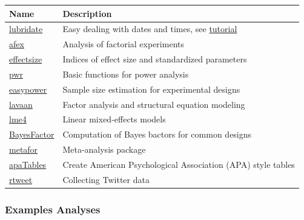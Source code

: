\documentclass[
]{scrartcl}
\newcounter{none} %
\begin{document}
{\def\LTcaptype{none} %
\begin{longtable}[]{@{}
  >{\raggedright\arraybackslash}p{}
  >{\raggedright\arraybackslash}p{}@{}}
\toprule\noalign{}
\begin{minipage}[b]{\linewidth}\raggedright
Name
\end{minipage} & \begin{minipage}[b]{\linewidth}\raggedright
Description
\end{minipage} \\
\midrule\noalign{}
\endhead
\bottomrule\noalign{}
\endlastfoot
\href{http://lubridate.tidyverse.org/}{lubridate} & Easy dealing with dates and times, see \href{https://r4ds.had.co.nz/dates-and-times.html}{tutorial} \\
\href{https://cran.r-project.org/web/packages/afex/}{afex} & Analysis of factorial experiments \\
\href{https://easystats.github.io/effectsize/}{effectsize} & Indices of effect size and standardized parameters \\
\href{https://cran.r-project.org/web/packages/pwr/}{pwr} & Basic functions for power analysis \\
\href{https://cran.r-project.org/web/packages/easypower}{easypower} & Sample size estimation for experimental designs \\
\href{https://www.lavaan.ugent.be/}{lavaan} & Factor analysis and structural equation modeling \\
\href{https://cran.r-project.org/web/packages/lme4/index.html}{lme4} & Linear mixed-effects models \\
\href{https://richarddmorey.github.io/BayesFactor/}{BayesFactor} & Computation of Bayes bactors for common designs \\
\href{http://www.metafor-project.org/}{metafor} & Meta-analysis package \\
\href{https://cran.r-project.org/web/packages/apaTables/index.html}{apaTables} & Create American Psychological Association (APA) style tables \\
\href{https://cran.r-project.org/web/packages/rtweet/index.html}{rtweet} & Collecting Twitter data \\
\end{longtable}
}

\subsubsection*{Examples Analyses}\label{examples-analyses}
\end{document}
